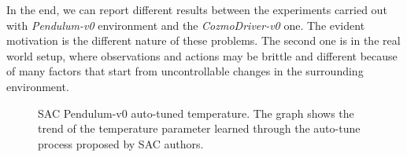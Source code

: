 In the end, we can report different results between the experiments carried out with \textit{Pendulum-v0} environment and the \textit{CozmoDriver-v0} one.
The evident motivation is the different nature of these problems.
The second one is in the real world setup, where observations and actions may be brittle and different because of many factors that start from uncontrollable changes in the surrounding environment.

%
%

\begin{figure}[!h]
	\centering
	\caption[SAC CozmoDriver-v0 auto-tuned temperature]{SAC Pendulum-v0 auto-tuned temperature.
		The graph shows the trend of the temperature parameter learned through the auto-tune process proposed by SAC authors.}
	\label{fig:sac_cozmo_temperature}
\end{figure}


%
%

